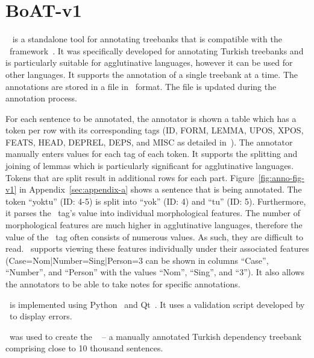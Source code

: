 \section{BoAT-v1}
\label{sec:boatvone}

\boatvone~\cite{turk-etal-2019-turkish} is a standalone tool for annotating treebanks that is compatible with the \ud\ framework~\cite{UD}.
It was specifically developed for annotating Turkish treebanks and is particularly suitable for agglutinative languages, however it can be used for other languages.
It supports the annotation of a single treebank at a time.
The annotations are stored in a file in \conllu\ format.
The file is updated during the annotation process.

For each sentence to be annotated, the annotator is shown a table which has a token per row with its corresponding tags (ID, FORM, LEMMA, UPOS, XPOS, FEATS, HEAD, DEPREL, DEPS, and MISC as detailed in~\cite{turk-etal-2019-turkish}).
The annotator manually enters values for each tag of each token.
It supports the splitting and joining of lemmas which is particularly significant for agglutinative languages.
Tokens that are split result in additional rows for each part.
Figure~\ref{fig:anno-fig-v1} in Appendix~\ref{sec:appendix-a} shows a sentence that is being annotated.
The token ``yoktu'' (ID: 4-5) is split into ``yok'' (ID: 4) and ``tu'' (ID: 5). 
Furthermore, it parses the \feats\ tag's value into individual morphological features.
The number of morphological features are much higher in agglutinative languages, therefore the value of the \feats\ tag often consists of numerous values.
As such, they are difficult to read.
\boatvone\ supports viewing these features individually under their associated features (Case=Nom|Number=Sing|Person=3 can be shown in columns ``Case'', ``Number'', and ``Person'' with the values ``Nom'', ``Sing'', and ``3'').
It also allows the annotators to be able to take notes for specific annotations.

\boatvone\ is implemented using Python~\cite{python} and Qt~\cite{qt}.
It uses a validation script developed by \ud\ to display errors.

\boatvone\ was used to create the \bountreebank~\cite{turk-etal-2019-turkish,turk2021resources,UD-Boun-Treebank} -- a manually annotated Turkish dependency treebank comprising close to 10 thousand sentences.
